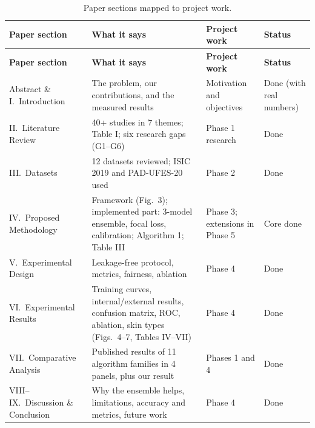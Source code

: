 \documentclass[10pt,a4paper]{article}
\begin{document}
{\small
\renewcommand{\arraystretch}{1.25}
\begin{longtable}{@{}L{3.3cm} L{5.4cm} L{3.9cm} L{2.2cm}@{}}
\caption{Paper sections mapped to project work.}\label{tab:map}\\
\toprule
\textbf{Paper section} & \textbf{What it says} & \textbf{Project work} & \textbf{Status} \\
\midrule
\endfirsthead
\toprule
\textbf{Paper section} & \textbf{What it says} & \textbf{Project work} & \textbf{Status} \\
\midrule
\endhead
Abstract \& I.~Introduction & The problem, our contributions, and the measured results & Motivation and objectives & Done (with real numbers) \\
II.~Literature Review & 40+ studies in 7 themes; Table I; six research gaps (G1--G6) & Phase 1 research & Done \\
III.~Datasets & 12 datasets reviewed; ISIC 2019 and PAD-UFES-20 used & Phase 2 & Done \\
IV.~Proposed Methodology & Framework (Fig.~3); implemented part: 3-model ensemble, focal loss, calibration; Algorithm 1; Table III & Phase 3; extensions in Phase 5 & Core done \\
V.~Experimental Design & Leakage-free protocol, metrics, fairness, ablation & Phase 4 & Done \\
VI.~Experimental Results & Training curves, internal/external results, confusion matrix, ROC, ablation, skin types (Figs.~4--7, Tables IV--VII) & Phase 4 & Done \\
VII.~Comparative Analysis & Published results of 11 algorithm families in 4 panels, plus our result & Phases 1 and 4 & Done \\
VIII--IX.~Discussion \& Conclusion & Why the ensemble helps, limitations, accuracy and metrics, future work & Phase 4 & Done \\
\bottomrule
\end{longtable}
}
\end{document}
